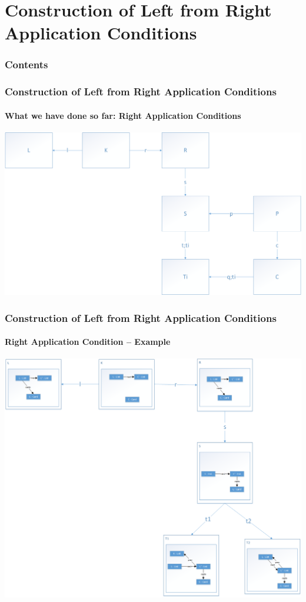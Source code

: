 \documentclass[32pt,t]{beamer}
\begin{document}
\section{Construction of Left from Right Application Conditions}
	\begin{frame}
		\frametitle{Contents}
		\tableofcontents[currentsection]
	\end{frame}

	\begin{frame}
		\frametitle{Construction of Left from Right Application Conditions}
		\framesubtitle{What we have done so far: Right Application Conditions}
		\centering
		\includegraphics[width=\linewidth]{Images/40_Overview_RightAC_Schema}
	\end{frame}

	\begin{frame}
		\frametitle{Construction of Left from Right Application Conditions}
		\framesubtitle{Right Application Condition -- Example}
		\centering
		\includegraphics[height=.8\textheight]{Images/51_RightAC-To-LeftAC_Example_Step1}
	\end{frame}
\end{document}
